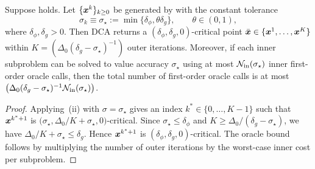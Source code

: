 \begin{theorem}
\label{cor:dca-inexact-target}
Suppose  holds. Let
$\{\bm{x}^k\}_{k\ge0}$ be generated by  with the
constant tolerance
\[
    \sigma_k\equiv\sigma_\star
    :=
    \min\{\delta_\phi,\theta\delta_g\},
    \qquad
    \theta\in(0,1),
\]
where $\delta_\phi,\delta_g>0$. Then DCA returns a
$(\delta_\phi,\delta_g,0)$-critical point
$\bar{\bm{x}}\in\{\bm{x}^1,\ldots,\bm{x}^K\}$ within $K = \left(\Delta_0(\delta_g-\sigma_\star)^{-1}\right)$ outer iterations. Moreover, if each inner subproblem can be solved to value accuracy
$\sigma_\star$ using at most $\mathcal N_{\rm in}(\sigma_\star)$
inner first-order oracle calls, then the total number of 
first-order oracle calls is at most $ \left(\Delta_0(\delta_g-\sigma_\star)^{-1}  \mathcal N_{\rm in}(\sigma_\star) \right)$.
\end{theorem}

\begin{proof}
Applying \,(ii) with
$\sigma=\sigma_\star$ gives an index $k^*\in\{0,\ldots,K-1\}$ such that
$\bm{x}^{k^*+1}$ is
$\bigl(\sigma_\star,\Delta_0/K+\sigma_\star,0\bigr)$-critical. Since
$\sigma_\star\le\delta_\phi$ and
$K\ge\Delta_0/(\delta_g-\sigma_\star)$, we have
$\Delta_0/K+\sigma_\star\le\delta_g$. Hence
$\bm{x}^{k^*+1}$ is $(\delta_\phi,\delta_g,0)$-critical. The oracle bound
follows by multiplying the number of outer iterations by the worst-case
inner cost per subproblem.
\end{proof}

